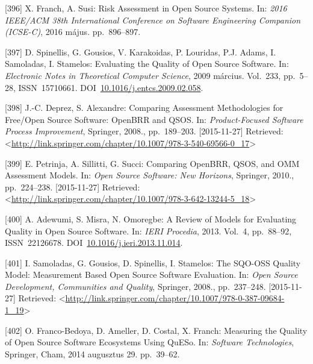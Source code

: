 \documentclass[12pt,magyar,a4paper,oneside]{scrreprt}
\newenvironment{cslreferences}%
  {}%
  {\par}
\begin{document}
\begin{cslreferences}
\leavevmode\hypertarget{ref-franch_risk_2016}{}%
{[}396{]} X. Franch, A. Susi: Risk Assessment in Open Source Systems.
In: \emph{2016 IEEE/ACM 38th International Conference on Software
Engineering Companion (ICSE-C)}, 2016 május. pp.~896--897.

\leavevmode\hypertarget{ref-spinellis_evaluating_2009}{}%
{[}397{]} D. Spinellis, G. Gousios, V. Karakoidas, P. Louridas, P.J.
Adams, I. Samoladas, I. Stamelos: Evaluating the Quality of Open Source
Software. In: \emph{Electronic Notes in Theoretical Computer Science},
2009 március. Vol.~233, pp.~5--28, ISSN~15710661.
DOI~\href{https://doi.org/10.1016/j.entcs.2009.02.058}{10.1016/j.entcs.2009.02.058}.

\leavevmode\hypertarget{ref-deprez_comparing_2008}{}%
{[}398{]} J.-C. Deprez, S. Alexandre: Comparing Assessment Methodologies
for Free/Open Source Software: OpenBRR and QSOS. In:
\emph{Product-Focused Software Process Improvement}, Springer, 2008.,
pp.~189--203. {[}2015-11-27{]} Retrieved:
\textless{}\url{http://link.springer.com/chapter/10.1007/978-3-540-69566-0_17}\textgreater{}

\leavevmode\hypertarget{ref-petrinja_comparing_2010}{}%
{[}399{]} E. Petrinja, A. Sillitti, G. Succi: Comparing OpenBRR, QSOS,
and OMM Assessment Models. In: \emph{Open Source Software: New
Horizons}, Springer, 2010., pp.~224--238. {[}2015-11-27{]} Retrieved:
\textless{}\url{http://link.springer.com/chapter/10.1007/978-3-642-13244-5_18}\textgreater{}

\leavevmode\hypertarget{ref-adewumi_review_2013}{}%
{[}400{]} A. Adewumi, S. Misra, N. Omoregbe: A Review of Models for
Evaluating Quality in Open Source Software. In: \emph{IERI Procedia},
2013. Vol.~4, pp.~88--92, ISSN~22126678.
DOI~\href{https://doi.org/10.1016/j.ieri.2013.11.014}{10.1016/j.ieri.2013.11.014}.

\leavevmode\hypertarget{ref-samoladas_sqo-oss_2008}{}%
{[}401{]} I. Samoladas, G. Gousios, D. Spinellis, I. Stamelos: The
SQO-OSS Quality Model: Measurement Based Open Source Software
Evaluation. In: \emph{Open Source Development, Communities and Quality},
Springer, 2008., pp.~237--248. {[}2015-11-27{]} Retrieved:
\textless{}\url{http://link.springer.com/chapter/10.1007/978-0-387-09684-1_19}\textgreater{}

\leavevmode\hypertarget{ref-franco-bedoya_measuring_2014}{}%
{[}402{]} O. Franco-Bedoya, D. Ameller, D. Costal, X. Franch: Measuring
the Quality of Open Source Software Ecosystems Using QuESo. In:
\emph{Software Technologies}, Springer, Cham, 2014 augusztus 29.
pp.~39--62.


\end{cslreferences}
\end{document}
